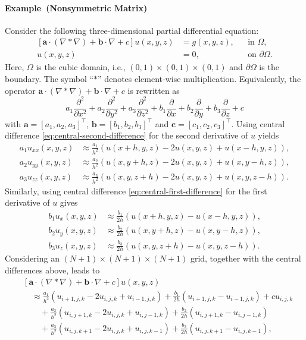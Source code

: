 \paragraph{Example~\theapplicationexample\space({Nonsymmetric Matrix})}\label{subsec:nonsymmetric-difference}
\begingroup\makeatletter\edef\@currentlabel{\theapplicationexample}\label{ex:nonsymmetric-difference}\makeatother\endgroup
{Consider the following three-dimensional partial differential equation:}
\[\begin{aligned}
[\boldsymbol{a}\cdot(\nabla*\nabla)+\boldsymbol{b}\cdot\nabla+c]u(x,y,z)&=g(x,y,z),&&\text{in }\Omega,\\
u(x,y,z)&=0,&&\text{on }\partial\Omega.
\end{aligned}\]
{Here, $\Omega$ is the cubic domain, i.e., $(0,1)\times(0,1)\times(0,1)$ and $\partial\Omega$ is the boundary. The symbol ``$*$'' denotes element-wise multiplication. Equivalently, the operator $\boldsymbol{a}\cdot(\nabla*\nabla)+\boldsymbol{b}\cdot\nabla+c$ is rewritten as}
\[a_1\frac{\partial^2}{\partial x^2}+a_2\frac{\partial^2}{\partial y^2}+a_3\frac{\partial^2}{\partial z^2}+b_1\frac{\partial}{\partial x}+b_2\frac{\partial}{\partial y}+b_3\frac{\partial}{\partial z}+c\]
{with $\boldsymbol{a}=[a_1,a_2,a_3]^{\top}$, $\boldsymbol{b}=[b_1,b_2,b_3]^{\top}$ and $\boldsymbol{c}=[c_1,c_2,c_3]^{\top}$. Using central difference \eqref{eq:central-second-difference} for the second derivative of $u$ yields}
\[\begin{aligned}
a_1u_{xx}(x,y,z)&\approx\frac{a_1}{h^2}(u(x+h,y,z)-2u(x,y,z)+u(x-h,y,z)),\\
a_2u_{yy}(x,y,z)&\approx\frac{a_2}{h^2}(u(x,y+h,z)-2u(x,y,z)+u(x,y-h,z)),\\
a_3u_{zz}(x,y,z)&\approx\frac{a_3}{h^2}(u(x,y,z+h)-2u(x,y,z)+u(x,y,z-h)).
\end{aligned}\]
{Similarly, using central difference \eqref{eq:central-first-difference} for the first derivative of $u$ gives}
\[\begin{aligned}
b_1u_x(x,y,z)&\approx\frac{b_1}{2h}(u(x+h,y,z)-u(x-h,y,z)),\\
b_2u_y(x,y,z)&\approx\frac{b_2}{2h}(u(x,y+h,z)-u(x,y-h,z)),\\
b_3u_z(x,y,z)&\approx\frac{b_3}{2h}(u(x,y,z+h)-u(x,y,z-h)).
\end{aligned}\]
{Considering an $(N+1)\times(N+1)\times(N+1)$ grid, together with the central differences above, leads to}
\[\begin{aligned}
&[\boldsymbol{a}\cdot(\nabla*\nabla)+\boldsymbol{b}\cdot\nabla+c]u(x,y,z)\\
&\quad\approx\frac{a_1}{h^2}(u_{i+1,j,k}-2u_{i,j,k}+u_{i-1,j,k})+\frac{b_1}{2h}(u_{i+1,j,k}-u_{i-1,j,k})+cu_{i,j,k}\\
&\qquad+\frac{a_2}{h^2}(u_{i,j+1,k}-2u_{i,j,k}+u_{i,j-1,k})+\frac{b_2}{2h}(u_{i,j+1,k}-u_{i,j-1,k})\\
&\qquad+\frac{a_3}{h^2}(u_{i,j,k+1}-2u_{i,j,k}+u_{i,j,k-1})+\frac{b_3}{2h}(u_{i,j,k+1}-u_{i,j,k-1}),
\end{aligned}\]

